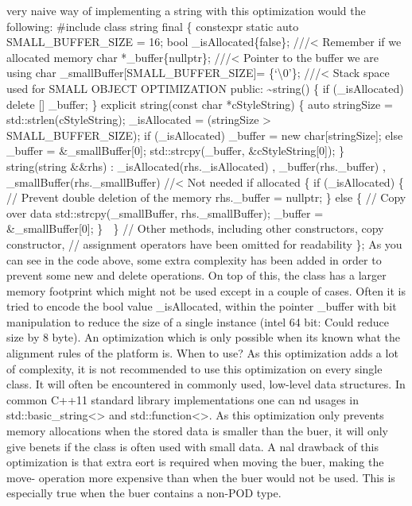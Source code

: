 very naive way of implementing a string with this optimization would the
following: \#include class string final \{ constexpr static auto
SMALL\_BUFFER\_SIZE = 16; bool \_isAllocated\{false\}; ///\textless{}
Remember if we allocated memory char *\_buffer\{nullptr\};
///\textless{} Pointer to the buffer we are using char
\_smallBuffer{[}SMALL\_BUFFER\_SIZE{]}= \{`\textbackslash0'\};
///\textless{} Stack space used for SMALL OBJECT OPTIMIZATION public:
\textasciitilde string() \{ if (\_isAllocated) delete {[}{]} \_buffer;
\} explicit string(const char *cStyleString) \{ auto stringSize =
std::strlen(cStyleString); \_isAllocated = (stringSize \textgreater{}
SMALL\_BUFFER\_SIZE); if (\_isAllocated) \_buffer = new
char{[}stringSize{]}; else \_buffer = \&\_smallBuffer{[}0{]};
std::strcpy(\_buffer, \&cStyleString{[}0{]}); \} string(string \&\&rhs)
: \_isAllocated(rhs.\_isAllocated) , \_buffer(rhs.\_buffer) ,
\_smallBuffer(rhs.\_smallBuffer) //\textless{} Not needed if allocated
\{ if (\_isAllocated) \{ // Prevent double deletion of the memory
rhs.\_buffer = nullptr; \} else \{ // Copy over data
std::strcpy(\_smallBuffer, rhs.\_smallBuffer); \_buffer =
\&\_smallBuffer{[}0{]}; \}  \} // Other methods, including other
constructors, copy constructor, // assignment operators have been
omitted for readability \}; As you can see in the code above, some extra
complexity has been added in order to prevent some new and delete
operations. On top of this, the class has a larger memory footprint
which might not be used except in a couple of cases. Often it is tried
to encode the bool value \_isAllocated, within the pointer \_buffer with
bit manipulation to reduce the size of a single instance (intel 64 bit:
Could reduce size by 8 byte). An optimization which is only possible
when its known what the alignment rules of the platform is. When to use?
As this optimization adds a lot of complexity, it is not recommended to
use this optimization on every single class. It will often be
encountered in commonly used, low-level data structures. In common C++11
standard library implementations one can nd usages in
std::basic\_string\textless\textgreater{} and
std::function\textless\textgreater. As this optimization only prevents
memory allocations when the stored data is smaller than the buer, it
will only give benets if the class is often used with small data. A nal
drawback of this optimization is that extra eort is required when moving
the buer, making the move- operation more expensive than when the buer
would not be used. This is especially true when the buer contains a
non-POD type.
